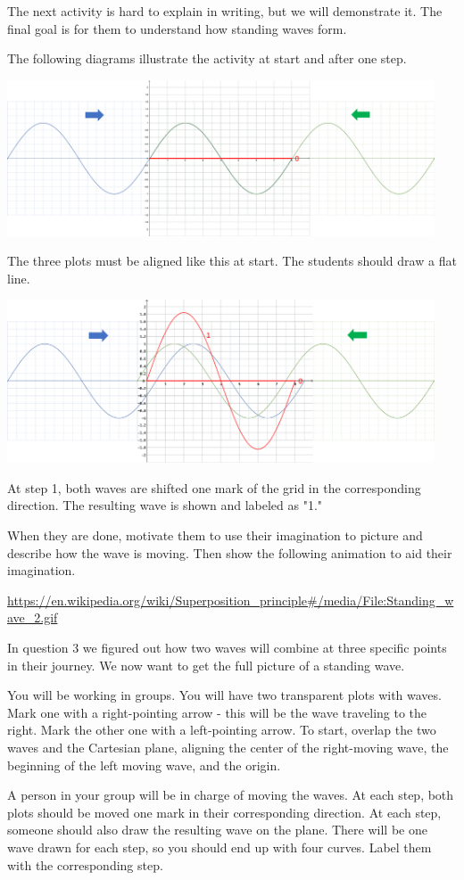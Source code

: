 \documentclass[12pt,noauthor,nooutcomes, instructornotes]{ximera}
\begin{document}
\begin{instructorNotes}
The next activity is hard to explain in writing, but we will demonstrate it. The final goal is for them to understand how standing waves form.

The following diagrams illustrate the activity at start and after one step.

\includegraphics[width=0.95\textwidth]{superposition/step0.png}

The three plots must be aligned like this at start. The students should draw a flat line.

\includegraphics[width=0.95\textwidth]{superposition/step1.png}

At step 1, both waves are shifted one mark of the grid in the corresponding direction. The resulting wave is shown and labeled as "1."

When they are done, motivate them to use their imagination to picture and describe how the wave is moving. Then show the following animation to aid their imagination.

\url{https://en.wikipedia.org/wiki/Superposition_principle#/media/File:Standing_wave_2.gif}
\end{instructorNotes}


\begin{question} In question 3 we figured out how two waves will combine at three specific points in their journey. We now want to get the full picture of a standing wave.

You will be working in groups. You will have two transparent plots with waves. Mark one with a right-pointing arrow - this will be the wave traveling to the right. Mark the other one with a left-pointing arrow. To start, overlap the two waves and the Cartesian plane, aligning the center of the right-moving wave, the beginning of the left moving wave, and the origin.

A person in your group will be in charge of moving the waves. At each step, both plots should be moved one mark in their corresponding direction. At each step, someone should also draw the resulting wave on the plane. There will be one wave drawn for each step, so you should end up with four curves. Label them with the corresponding step.

\end{question}
\end{document}
